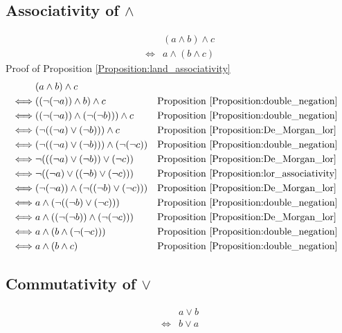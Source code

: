\subsection{Associativity of $\land$}
\begin{prop}
\label{Proposition:land_associativity}
\begin{align*}
& (a \land b) \land c \\
\iff & a \land (b \land c)
\end{align*}
Proof of Proposition \ref{Proposition:land_associativity}
\begin{align*}
& (a \land b) \land c \\
\iff & ((\lnot (\lnot a)) \land b) \land c
& & \text{Proposition \ref{Proposition:double_negation}} \\
\iff & ((\lnot (\lnot a)) \land (\lnot (\lnot b))) \land c
& & \text{Proposition \ref{Proposition:double_negation}} \\
\iff & (\lnot ((\lnot a) \lor (\lnot b))) \land c
& & \text{Proposition \ref{Proposition:De_Morgan_lor}} \\
\iff & (\lnot ((\lnot a) \lor (\lnot b))) \land (\lnot (\lnot c))
& & \text{Proposition \ref{Proposition:double_negation}} \\
\iff & \lnot (((\lnot a) \lor (\lnot b)) \lor (\lnot c))
& & \text{Proposition \ref{Proposition:De_Morgan_lor}} \\
\iff & \lnot ((\lnot a) \lor ((\lnot b) \lor (\lnot c)))
& & \text{Proposition \ref{Proposition:lor_associativity}} \\
\iff & (\lnot (\lnot a)) \land (\lnot ((\lnot b) \lor (\lnot c)))
& & \text{Proposition \ref{Proposition:De_Morgan_lor}} \\
\iff & a \land (\lnot ((\lnot b) \lor (\lnot c)))
& & \text{Proposition \ref{Proposition:double_negation}} \\
\iff & a \land ((\lnot (\lnot b)) \land (\lnot (\lnot c)))
& & \text{Proposition \ref{Proposition:De_Morgan_lor}} \\
\iff & a \land (b \land (\lnot (\lnot c)))
& & \text{Proposition \ref{Proposition:double_negation}} \\
\iff & a \land (b \land c)
& & \text{Proposition \ref{Proposition:double_negation}} \\
\end{align*}
\end{prop}

\subsection{Commutativity of $\lor$}
\begin{prop}
\label{Proposition:lor_commutativity}
\begin{align*}
& a \lor b \\
\iff & b \lor a
\end{align*}
\end{prop}

